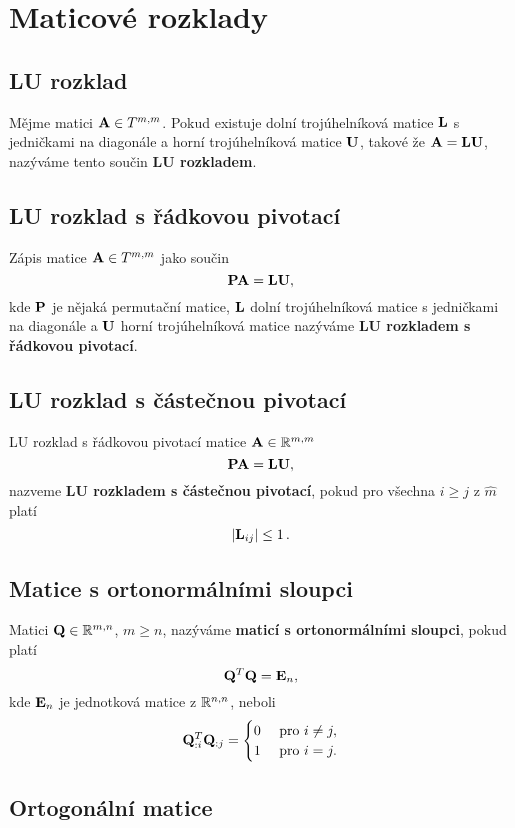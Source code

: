 \section{Maticové rozklady}

\subsection*{LU rozklad}

Mějme matici $\mathbf{A}\in T^{m,m}$. Pokud existuje dolní trojúhelníková matice $\mathbf{L}$ s jedničkami na diagonále a horní trojúhelníková matice $\mathbf{U}$, takové že $\mathbf{A}=\mathbf{L}\mathbf{U}$, nazýváme tento součin \textbf{LU rozkladem}.

\subsection*{LU rozklad s řádkovou pivotací}

Zápis matice $\mathbf{A} \in T^{m,m}$ jako součin
\[ \mathbf{P}\mathbf{A} = \mathbf{L}\mathbf{U}, \]
kde $\mathbf{P}$ je nějaká permutační matice, $\mathbf{L}$ dolní trojúhelníková matice s jedničkami na diagonále a $\mathbf{U}$ horní trojúhelníková matice nazýváme \textbf{LU rozkladem s řádkovou pivotací}.

\subsection*{LU rozklad s částečnou pivotací}

LU rozklad s řádkovou pivotací matice $\mathbf{A} \in \mathbb{R}^{m,m}$
\[ \mathbf{P}\mathbf{A} = \mathbf{L}\mathbf{U}, \]
nazveme \textbf{LU rozkladem s částečnou pivotací}, pokud pro všechna $i \geq j$ z $\hat m$ platí
\[ |\mathbf{L}_{ij}|\leq 1\,. \]

\subsection*{Matice s ortonormálními sloupci}

Matici $\mathbf{Q}\in\mathbb{R}^{m,n}$, $m \ge n$, nazýváme \textbf{maticí s ortonormálními sloupci}, pokud platí
\[ \mathbf{Q}^T\mathbf{Q} = \mathbf{E}_n, \]
kde $\mathbf{E}_n$ je jednotková matice z $\mathbb{R}^{n,n}$, neboli
\[ \mathbf{Q}_{:i}^T\mathbf{Q}_{:j} = \begin{cases} 0 & \text{ pro } i \neq j, \\ 1 & \text{ pro } i = j. \end{cases} \]

\subsection*{Ortogonální matice}

